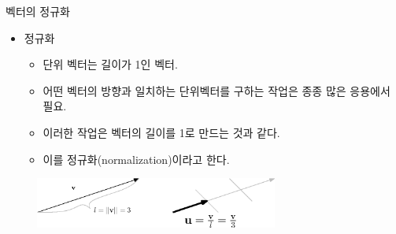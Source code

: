 \begin{frame}{벡터의 정규화}
\begin{itemize}
	\item 정규화
	\begin{itemize}
	\item 단위 벡터는 길이가 1인 벡터.
	\item 어떤 벡터의 방향과 일치하는 단위벡터를 구하는 작업은 종종 많은 응용에서 필요.
	\item 이러한 작업은 벡터의 길이를 1로 만드는 것과 같다.
	\item 이를 정규화(normalization)이라고 한다.
	\end{itemize}
\end{itemize}

\begin{figure}
\includegraphics[width=8cm]{Math_vector/unitVector.eps}
\end{figure}
\end{frame}

